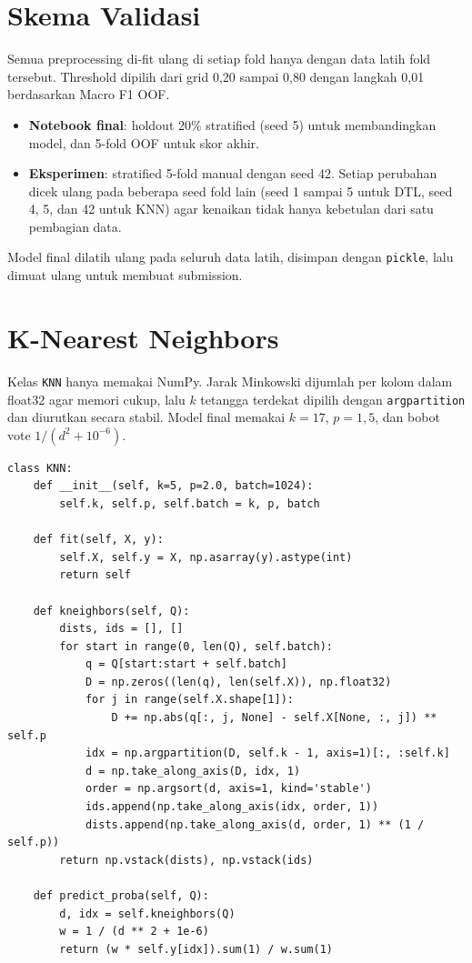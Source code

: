 \section{Skema Validasi}
Semua preprocessing di-fit ulang di setiap fold hanya dengan data latih fold tersebut. Threshold dipilih dari grid 0,20 sampai 0,80 dengan langkah 0,01 berdasarkan Macro F1 OOF.
\begin{itemize}
  \item \textbf{Notebook final}: holdout 20\% stratified (seed 5) untuk membandingkan model, dan 5-fold OOF untuk skor akhir.
  \item \textbf{Eksperimen}: stratified 5-fold manual dengan seed 42. Setiap perubahan dicek ulang pada beberapa seed fold lain (seed 1 sampai 5 untuk DTL, seed 4, 5, dan 42 untuk KNN) agar kenaikan tidak hanya kebetulan dari satu pembagian data.
\end{itemize}
Model final dilatih ulang pada seluruh data latih, disimpan dengan \texttt{pickle}, lalu dimuat ulang untuk membuat submission.

\section{K-Nearest Neighbors}
\label{sec:knn}
Kelas \texttt{KNN} hanya memakai NumPy. Jarak Minkowski dijumlah per kolom dalam float32 agar memori cukup, lalu $k$ tetangga terdekat dipilih dengan \texttt{argpartition} dan diurutkan secara stabil. Model final memakai $k=17$, $p=1{,}5$, dan bobot vote $1/(d^2+10^{-6})$.

\begin{lstlisting}[caption={Kelas KNN (\texttt{src/main.ipynb})}, label={lst:knn}]
class KNN:
    def __init__(self, k=5, p=2.0, batch=1024):
        self.k, self.p, self.batch = k, p, batch

    def fit(self, X, y):
        self.X, self.y = X, np.asarray(y).astype(int)
        return self

    def kneighbors(self, Q):
        dists, ids = [], []
        for start in range(0, len(Q), self.batch):
            q = Q[start:start + self.batch]
            D = np.zeros((len(q), len(self.X)), np.float32)
            for j in range(self.X.shape[1]):
                D += np.abs(q[:, j, None] - self.X[None, :, j]) ** self.p
            idx = np.argpartition(D, self.k - 1, axis=1)[:, :self.k]
            d = np.take_along_axis(D, idx, 1)
            order = np.argsort(d, axis=1, kind='stable')
            ids.append(np.take_along_axis(idx, order, 1))
            dists.append(np.take_along_axis(d, order, 1) ** (1 / self.p))
        return np.vstack(dists), np.vstack(ids)

    def predict_proba(self, Q):
        d, idx = self.kneighbors(Q)
        w = 1 / (d ** 2 + 1e-6)
        return (w * self.y[idx]).sum(1) / w.sum(1)
\end{lstlisting}

